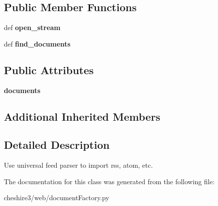 \subsection*{Public Member Functions}
\begin{DoxyCompactItemize}
\item 
\hypertarget{classcheshire3_1_1web_1_1document_factory_1_1_oai_document_stream_1_1_syndication_document_stream_ac0de7f8017c09f57bfabfa5d5dbf896b}{def {\bfseries open\-\_\-stream}}\label{classcheshire3_1_1web_1_1document_factory_1_1_oai_document_stream_1_1_syndication_document_stream_ac0de7f8017c09f57bfabfa5d5dbf896b}

\item 
\hypertarget{classcheshire3_1_1web_1_1document_factory_1_1_oai_document_stream_1_1_syndication_document_stream_ad7bf3b581e098b89555369595c5662ec}{def {\bfseries find\-\_\-documents}}\label{classcheshire3_1_1web_1_1document_factory_1_1_oai_document_stream_1_1_syndication_document_stream_ad7bf3b581e098b89555369595c5662ec}

\end{DoxyCompactItemize}
\subsection*{Public Attributes}
\begin{DoxyCompactItemize}
\item 
\hypertarget{classcheshire3_1_1web_1_1document_factory_1_1_oai_document_stream_1_1_syndication_document_stream_a731977863a01929e7fe5a11326851aa9}{{\bfseries documents}}\label{classcheshire3_1_1web_1_1document_factory_1_1_oai_document_stream_1_1_syndication_document_stream_a731977863a01929e7fe5a11326851aa9}

\end{DoxyCompactItemize}
\subsection*{Additional Inherited Members}


\subsection{Detailed Description}
\begin{DoxyVerb}Use universal feed parser to import rss, atom, etc.\end{DoxyVerb}
 

The documentation for this class was generated from the following file\-:\begin{DoxyCompactItemize}
\item 
cheshire3/web/document\-Factory.\-py\end{DoxyCompactItemize}
